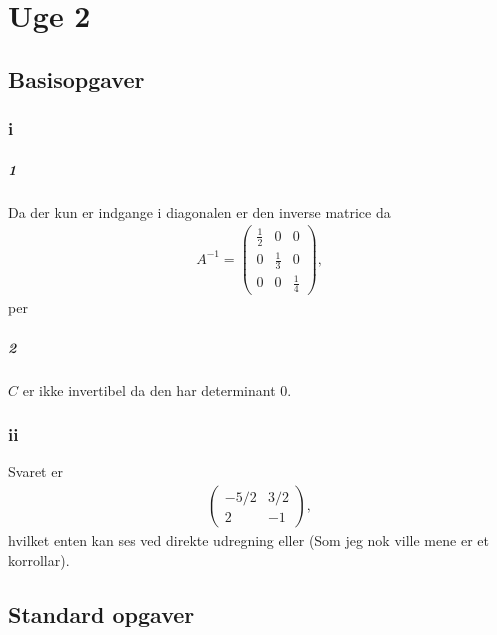 
\chapter{Uge 2}

	\section{Basisopgaver}

		\subsection{i}

			\paragraph{1} Da der kun er indgange i diagonalen er den inverse matrice da
				\begin{align*}
					A^{-1}=\left(\begin{array}{lll}{\frac{1}{2}} & {0} & {0} \\ {0} & {\frac{1}{3}} & {0} \\ {0} & {0} & {\frac{1}{4}}\end{array}\right),
				\end{align*} 
			per \cite[Sætning 2.4.12]{hesselholt2017}

			\paragraph{2} $C$ er ikke invertibel da den har determinant $0$.

		\subsection{ii}

			Svaret er 
				\begin{align*}
					\left(\begin{array}{cc}{-5 / 2} & {3 / 2} \\ {2} & {-1}\end{array}\right),
				\end{align*} 
			hvilket enten kan ses ved direkte udregning eller \cite[Eksempel 3.4.3]{hesselholt2017} (Som jeg nok ville mene er et korrollar). 

	\section{Standard opgaver}

